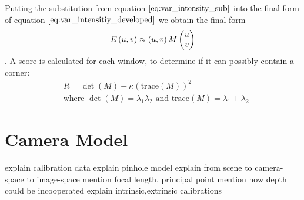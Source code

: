 Putting the substitution from equation $\ref{eq:var_intensity_sub}$ into the final form of equation $\ref{eq:var_intensitiy_developed}$ we obtain the final form
\begin{equation}
	E \left( u, v \right) \approx \left( u,v \right) M \colvec{u}{v}
\end{equation}.
A score is calculated for each window, to determine if it can possibly contain a corner:
\begin{equation}
\begin{aligned}
& R = \det(M) - \kappa \left(\text{trace}(M)\right)^2 \\
&\text{where } \det(M) = \lambda_1 \lambda_2 \text{ and } \text{trace}(M) = \lambda_1 + \lambda_2
\end{aligned}
\label{eq:harris_response}
\end{equation}

\section{Camera Model}
explain calibration data
explain pinhole model
explain from scene to camera-space to image-space
mention focal length, principal point
mention how depth could be incooperated
explain intrinsic,extrinsic calibrations
